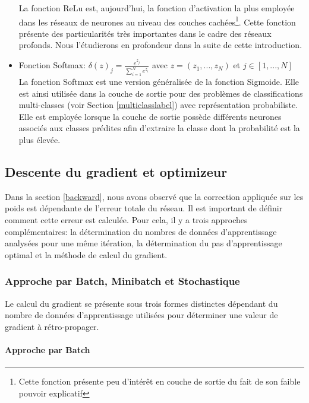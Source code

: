 \begin{itemize}
    La fonction ReLu est, aujourd'hui, la fonction d'activation la plus employée dans les réseaux de neurones au niveau des couches cachées\footnote{Cette fonction présente peu d'intérêt en couche de sortie du fait de son faible pouvoir explicatif}. Cette fonction présente des particularités très importantes dans le cadre des réseaux profonds. Nous l'étudierons en profondeur dans la suite de cette introduction.

    \item Fonction Softmax: $\delta(z)_j=\frac{e^{z_j}}{\sum_{i=1}^{N}e^{z_i}}$ avec $z=(z_1,...,z_N)$ et $j \in [1,...,N]$ \\

    La fonction Softmax est une version généralisée de la fonction Sigmoide. Elle est ainsi utilisée dans la couche de sortie pour des problèmes de classifications multi-classes (voir Section \ref{multiclasslabel}) avec représentation probabiliste. Elle est employée lorsque la couche de sortie possède différents neurones associés aux classes prédites afin d'extraire la classe dont la probabilité est la plus élevée.
\end{itemize}

\subsection{Descente du gradient et optimizeur}
\label{optimizer}

Dans la section \ref{backward}, nous avons observé que la correction appliquée sur les poids est dépendante de l'erreur totale du réseau. Il est important de définir comment cette erreur est calculée. Pour cela, il y a trois approches complémentaires: la détermination du nombres de données d'apprentissage analysées pour une même itération, la détermination du pas d'apprentissage optimal et la méthode de calcul du gradient.

\subsubsection{Approche par Batch, Minibatch et Stochastique}
Le calcul du gradient se présente sous trois formes distinctes dépendant du nombre de données d'apprentissage utilisées pour déterminer une valeur de gradient à rétro-propager.\\

\paragraph{Approche par Batch}

